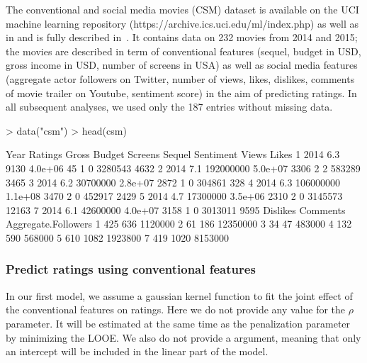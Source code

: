 The conventional and social media movies (CSM) dataset is available on the UCI machine learning repository (https://archive.ics.uci.edu/ml/index.php) as well as in  and is fully described in~\cite{ahmed2015using}. It contains data on 232 movies from 2014 and 2015; the movies are described in term of conventional features (sequel, budget in USD, gross income in USD, number of screens in USA) as well as social media features (aggregate actor followers on Twitter, number of views, likes, dislikes, comments of movie trailer on Youtube, sentiment score) in the aim of predicting ratings. In all subsequent analyses, we used only the 187 entries without missing data.


\begin{example}
> data("csm")
> head(csm)
\end{example}
\begin{example}
  Year Ratings     Gross  Budget Screens Sequel Sentiment   Views Likes
1 2014     6.3      9130 4.0e+06      45      1         0 3280543  4632
2 2014     7.1 192000000 5.0e+07    3306      2         2  583289  3465
3 2014     6.2  30700000 2.8e+07    2872      1         0  304861   328
4 2014     6.3 106000000 1.1e+08    3470      2         0  452917  2429
5 2014     4.7  17300000 3.5e+06    2310      2         0 3145573 12163
7 2014     6.1  42600000 4.0e+07    3158      1         0 3013011  9595
  Dislikes Comments Aggregate.Followers
1      425      636             1120000
2       61      186            12350000
3       34       47              483000
4      132      590              568000
5      610     1082             1923800
7      419     1020             8153000
\end{example}


\subsubsection{Predict ratings using conventional features} \label{sec:illustrations-csm-model1}

In our first model, we assume a gaussian kernel function to fit the joint effect of the conventional features on ratings. Here we do not provide any value for the $\rho$ parameter. It will be estimated at the same time as the penalization parameter by minimizing the LOOE. We also do not provide a  argument, meaning that only an intercept will be included in the linear part of the model.


